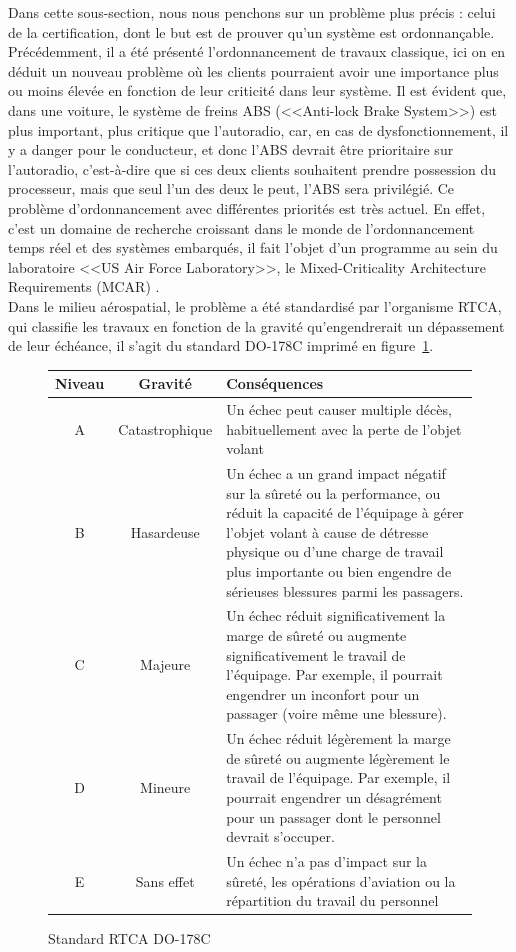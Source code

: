 \documentclass[12pt,a4paper,oneside]{book}
\theoremstyle{break}
\theoremstyle{breakplain}
\begin{document}
Dans cette sous-section, nous nous penchons sur un problème plus précis : celui de la certification, dont le but est de prouver qu'un système est ordonnançable.\\

Précédemment, il a été présenté l'ordonnancement de travaux classique, ici on en déduit un nouveau problème où les clients pourraient avoir une importance plus ou moins élevée en fonction de leur criticité dans leur système. 
Il est évident que, dans une voiture, le système de freins ABS (<<Anti-lock Brake System>>) est plus important, plus critique que l'autoradio, car, en cas de dysfonctionnement, il y a danger pour le conducteur, et donc l'ABS devrait être prioritaire sur l'autoradio, c'est-à-dire que si ces deux clients souhaitent prendre possession du processeur, mais que seul l'un des deux le peut, l'ABS sera privilégié. Ce problème d'ordonnancement avec différentes priorités est très actuel. En effet, c'est un domaine de recherche croissant dans le monde de l'ordonnancement temps réel et des systèmes embarqués, il fait l'objet d'un programme au sein du laboratoire <<US Air Force Laboratory>>, le Mixed-Criticality Architecture Requirements (MCAR) \cite{de2009scheduling}.\\

Dans le milieu aérospatial, le problème a été standardisé par l'organisme RTCA, qui classifie les travaux en fonction de la gravité qu'engendrerait un dépassement de leur échéance, il s'agit du standard DO-178C imprimé en figure~\ref{do178}.\\
\begin{figure}[h]
\begin{tabularx}{\textwidth}{|c|c|X|}
\hline
Niveau & Gravité & Conséquences\\
\hline
A & Catastrophique & Un échec peut causer multiple décès, habituellement avec la perte de l'objet volant\\
\hline
B & Hasardeuse & Un échec a un grand impact négatif sur la sûreté ou la performance, ou réduit la capacité de l'équipage à gérer l'objet volant à cause de détresse physique ou d'une charge de travail plus importante ou bien engendre de sérieuses blessures parmi les passagers.\\
\hline
C & Majeure & Un échec réduit significativement la marge de sûreté ou augmente significativement le travail de l'équipage. Par exemple, il pourrait engendrer un inconfort pour un passager (voire même une blessure).\\
\hline
D & Mineure & Un échec réduit légèrement la marge de sûreté ou augmente légèrement le travail de l'équipage. Par exemple, il pourrait engendrer un désagrément pour un passager dont le personnel devrait s'occuper.\\
\hline
E & Sans effet & Un échec n'a pas d'impact sur la sûreté, les opérations d'aviation ou la répartition du travail du personnel\\
\hline
\end{tabularx}
\caption{Standard RTCA DO-178C \cite{nordhoff2012do178}}
\label{do178}
\end{figure}
\end{document}
